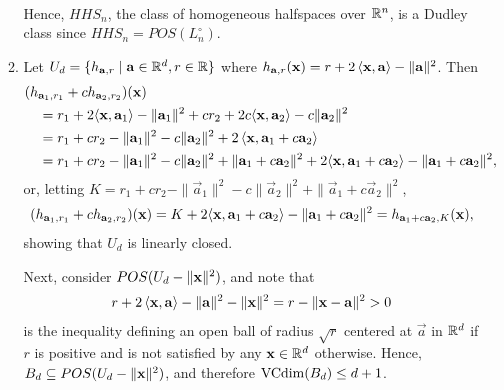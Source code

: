 \begin{ex}
\begin{enumerate}
\begin{enumerate}[1.]
\begin{align*}
                  \end{align*}
                  Hence, $HHS_n$, the class of homogeneous halfspaces
                  over $\mathbb{R}^n$, is a Dudley class since
                  $HHS_n=POS(L^\circ_n)$.
            \item Let $U_d=\{h_{\mathbf{a}, r} \mid \mathbf{a}\in\mathbb{R}^d, r\in\mathbb{R}\}$
                  where $h_{\mathbf{a},r}(\mathbf{x})=r+2\left\langle\mathbf{x},\mathbf{a}\right\rangle-\|\mathbf{a}\|^2$.
                  Then
                  \begin{align*}
                     & (h_{\mathbf{a}_1,r_1} + ch_{\mathbf{a}_2,r_2})(\mathbf{x}) \\
                     & \quad =r_1+2\langle\mathbf{x},\mathbf{a}_1\rangle
                    -\|\mathbf{a}_1\|^2
                    +cr_2+2c\langle\mathbf{x},\mathbf{a}_2\rangle
                    -c\|\mathbf{a}_2\|^2                               \\
                     & \quad =r_1+cr_2
                    -\|\mathbf{a}_1\|^2
                    -c\|\mathbf{a}_2\|^2
                    +2\left\langle \mathbf{x}, \mathbf{a}_1 + c\mathbf{a}_2 \right\rangle            \\
                     & \quad =r_1+cr_2
                    -\|\mathbf{a}_1\|^2
                    -c\|\mathbf{a}_2\|^2
                    +\|\mathbf{a}_1+c\mathbf{a}_2\|^2
                    +2\langle\mathbf{x},\mathbf{a}_1+c\mathbf{a}_2\rangle
                    -\|\mathbf{a}_1+c\mathbf{a}_2\|^2,
                  \end{align*}
                  or, letting $K=
                    r_1+cr_2
                    -\|\vec{a}_1\|^2
                    -c\|\vec{a}_2\|^2
                    +\|\vec{a}_1+c\vec{a}_2\|^2
                  $,
                  \begin{align*}
                    (h_{\mathbf{a}_1,r_1} + ch_{\mathbf{a}_2,r_2})(\mathbf{x})
                    =K+2\langle\mathbf{x},\mathbf{a}_1+c\mathbf{a}_2\rangle
                    -\|\mathbf{a}_1+c\mathbf{a}_2\|^2
                    =h_{\mathbf{a}_1+c\mathbf{a}_2, K}(\mathbf{x}),
                  \end{align*}
                  showing that $U_d$ is linearly closed.

                  Next, consider $POS(U_d-\|\mathbf{x}\|^2)$, and note that
                  \begin{align*}
                    r+2\left\langle \mathbf{x}, \mathbf{a}\right\rangle -\|\mathbf{a}\|^2-\|\mathbf{x}\|^2
                    =r-\|\mathbf{x}-\mathbf{a}\|^2>0
                  \end{align*}
                  is the inequality defining an open ball of
                  radius $\sqrt{r}$ centered at $\vec{a}$ in $\mathbb{R}^d$ if $r$ is
                  positive and is not satisfied by any $\mathbf{x}\in\mathbb{R}^d$ otherwise.
                  Hence, $B_d\subseteq POS(U_d-\|\mathbf{x}\|^2)$, and therefore
                  $\operatorname{VCdim}(B_d)\leq d+1$.


\end{enumerate}
\end{enumerate}
\end{ex}
